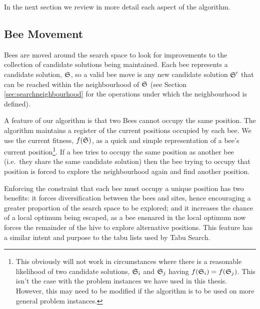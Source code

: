 In the next section we review in more detail each aspect of the algorithm. 

\subsection{Bee Movement}
\label{sec:beemovement}

Bees are moved around the search space to look for improvements to the collection of candidate solutions being maintained. Each bee represents a candidate solution, $\mathfrak{S}$, so a valid bee move is any new candidate solution $\mathfrak{S}'$ that can be reached within the neighbourhood of $\mathfrak{S}$ (see Section \ref{sec:searchneighbourhood} for the operations under which the neighbourhood is defined).


A feature of our algorithm is that two Bees cannot occupy the same position. The algorithm maintains a register of the current positions occupied by each bee. We use the current fitness, $f(\mathfrak{S})$, as a quick and simple representation of a bee's current position\footnote{This obviously will not work in circumstances where there is a reasonable likelihood of two candidate solutions, $\mathfrak{S}_i$ and $\mathfrak{S}_j$ having $f(\mathfrak{S}_i) = f(\mathfrak{S}_j)$. This isn't the case with the problem instances we have used in this thesis. However, this may need to be modified if the algorithm is to be used on more general problem instances.}. If a bee tries to occupy the same position as another bee (i.e.~they share the same candidate solution) then the bee trying to occupy that position is forced to explore the neighbourhood again and find another position. 

Enforcing the constraint that each bee must occupy a unique position has two benefits: it forces diversification between the bees and sites, hence encouraging a greater proportion of the search space to be explored; and it increases the chance of a local optimum being escaped, as a bee ensnared in the local optimum now forces the remainder of the hive to explore alternative positions. This feature has a similar intent and purpose to the tabu lists used by Tabu Search.

